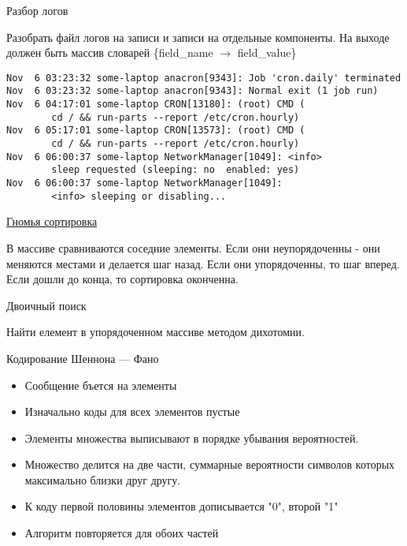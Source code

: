 \documentclass{article}
\begin{document}
\begin{center} Разбор логов \end{center}
Разобрать файл логов на записи и записи на отдельные компоненты.
На выходе должен быть массив словарей \{field\_name $\rightarrow$ field\_value\}
\begin{Large}
\begin{lstlisting}
Nov  6 03:23:32 some-laptop anacron[9343]: Job 'cron.daily' terminated
Nov  6 03:23:32 some-laptop anacron[9343]: Normal exit (1 job run)
Nov  6 04:17:01 some-laptop CRON[13180]: (root) CMD (   
        cd / && run-parts --report /etc/cron.hourly)
Nov  6 05:17:01 some-laptop CRON[13573]: (root) CMD (   
        cd / && run-parts --report /etc/cron.hourly)
Nov  6 06:00:37 some-laptop NetworkManager[1049]: <info> 
        sleep requested (sleeping: no  enabled: yes)
Nov  6 06:00:37 some-laptop NetworkManager[1049]: 
        <info> sleeping or disabling...
\end{lstlisting}
\end{Large}
\newpage

\begin{center}
\href{http://ru.wikipedia.org/wiki/%D0%93%D0%BD%D0%BE%D0%BC%D1%8C%D1%8F_%D1%81%D0%BE%D1%80%D1%82%D0%B8%D1%80%D0%BE%D0%B2%D0%BA%D0%B0}{Гномья сортировка}
\end{center}
В массиве сравниваются соседние элементы. 
Если они неупорядоченны - они меняются местами и делается шаг назад.
Если они упорядоченны, то шаг вперед. 
Если дошли до конца, то сортировка оконченна.
\newpage

\begin{center} Двоичный поиск \end{center}
Найти елемент в упорядоченном массиве методом дихотомии.
\newpage

\begin{center} Кодирование Шеннона — Фано \end{center}
\begin{itemize}
    \item Сообщение бъется на элементы
    \item Изначально коды для всех элементов пустые
    \item Элементы множества выписывают в порядке убывания вероятностей.
    \item Множество делится на две части, суммарные вероятности символов которых
            максимально близки друг другу.
    \item К коду первой половины элементов дописывается "0", второй "1"
    \item Алгоритм повторяется для обоих частей
\end{itemize}
\newpage
\end{document}
